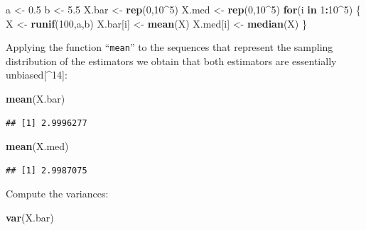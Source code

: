 \documentclass[]{krantz}
\makeatletter
\newenvironment{Shaded}{\begin{snugshade}}{\end{snugshade}}
\newcommand{\KeywordTok}[1]{\textcolor[rgb]{0.13,0.29,0.53}{\textbf{#1}}}
\newcommand{\DecValTok}[1]{\textcolor[rgb]{0.00,0.00,0.81}{#1}}
\newcommand{\FloatTok}[1]{\textcolor[rgb]{0.00,0.00,0.81}{#1}}
\newcommand{\StringTok}[1]{\textcolor[rgb]{0.31,0.60,0.02}{#1}}
\newcommand{\ControlFlowTok}[1]{\textcolor[rgb]{0.13,0.29,0.53}{\textbf{#1}}}
\newcommand{\OperatorTok}[1]{\textcolor[rgb]{0.81,0.36,0.00}{\textbf{#1}}}
\newcommand{\NormalTok}[1]{#1}
\newenvironment{kframe}{%
\medskip{}
\setlength{\fboxsep}{.8em}
 \def\at@end@of@kframe{}%
 \ifinner\ifhmode%
  \def\at@end@of@kframe{\end{minipage}}%
  \begin{minipage}{\columnwidth}%
 \fi\fi%
 \def\FrameCommand##1{\hskip\@totalleftmargin \hskip-\fboxsep
 \colorbox{shadecolor}{##1}\hskip-\fboxsep
     \hskip-\linewidth \hskip-\@totalleftmargin \hskip\columnwidth}%
 \MakeFramed {\advance\hsize-\width
   \@totalleftmargin\z@ \linewidth\hsize
   \@setminipage}}%
 {\par\unskip\endMakeFramed%
 \at@end@of@kframe}
\renewenvironment{Shaded}{\begin{kframe}}{\end{kframe}}
\theoremstyle{definition}
\theoremstyle{definition}
\theoremstyle{definition}
\theoremstyle{remark}
\makeatother
\begin{document}
\begin{enumerate}
\begin{Shaded}
\begin{Highlighting}[]
\NormalTok{a <-}\StringTok{ }\FloatTok{0.5}
\NormalTok{b <-}\StringTok{ }\FloatTok{5.5}
\NormalTok{X.bar <-}\StringTok{ }\KeywordTok{rep}\NormalTok{(}\DecValTok{0}\NormalTok{,}\DecValTok{10}\OperatorTok{^}\DecValTok{5}\NormalTok{)}
\NormalTok{X.med <-}\StringTok{ }\KeywordTok{rep}\NormalTok{(}\DecValTok{0}\NormalTok{,}\DecValTok{10}\OperatorTok{^}\DecValTok{5}\NormalTok{)}
\ControlFlowTok{for}\NormalTok{(i }\ControlFlowTok{in} \DecValTok{1}\OperatorTok{:}\DecValTok{10}\OperatorTok{^}\DecValTok{5}\NormalTok{) \{}
\NormalTok{  X <-}\StringTok{ }\KeywordTok{runif}\NormalTok{(}\DecValTok{100}\NormalTok{,a,b)}
\NormalTok{  X.bar[i] <-}\StringTok{ }\KeywordTok{mean}\NormalTok{(X)}
\NormalTok{  X.med[i] <-}\StringTok{ }\KeywordTok{median}\NormalTok{(X)}
\NormalTok{\}}
\end{Highlighting}
\end{Shaded}

  Applying the function ``\texttt{mean}'' to the sequences that
  represent the sampling distribution of the estimators we obtain that
  both estimators are essentially unbiased{[}\^{}14{]}:

\begin{Shaded}
\begin{Highlighting}[]
\KeywordTok{mean}\NormalTok{(X.bar)}
\end{Highlighting}
\end{Shaded}

\begin{verbatim}
## [1] 2.9996277
\end{verbatim}

\begin{Shaded}
\begin{Highlighting}[]
\KeywordTok{mean}\NormalTok{(X.med)}
\end{Highlighting}
\end{Shaded}

\begin{verbatim}
## [1] 2.9987075
\end{verbatim}

  Compute the variances:

\begin{Shaded}
\begin{Highlighting}[]
\KeywordTok{var}\NormalTok{(X.bar)}
\end{Highlighting}
\end{Shaded}


\end{enumerate}
\end{document}
